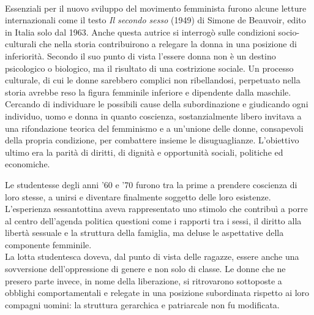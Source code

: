 \paragraph{}Essenziali per il nuovo sviluppo del movimento femminista furono alcune letture internazionali come il testo \textit{Il secondo sesso} (1949) di Simone de Beauvoir, edito in Italia solo dal 1963.
Anche questa autrice si interrogò sulle condizioni socio-culturali che nella storia contribuirono a relegare la donna in una posizione di inferiorità.
Secondo il suo punto di vista l'essere donna non è un destino psicologico o biologico, ma il risultato di una costrizione sociale.
Un processo culturale, di cui le donne sarebbero complici non ribellandosi, perpetuato nella storia avrebbe reso la figura femminile inferiore e dipendente dalla maschile.
Cercando di individuare le possibili cause della subordinazione e giudicando ogni individuo, uomo e donna in quanto coscienza, sostanzialmente libero invitava a una rifondazione teorica del femminismo e a un'unione delle donne, consapevoli della propria condizione, per combattere insieme le disuguaglianze.
L'obiettivo ultimo era la parità di diritti, di dignità e opportunità sociali, politiche ed economiche.

Le studentesse degli anni '60 e '70 furono tra la prime a prendere coscienza di loro stesse, a unirsi e diventare finalmente soggetto delle loro esistenze.
L'esperienza sessantottina aveva rappresentato uno stimolo che contribuì a porre al centro dell'agenda politica questioni come i rapporti tra i sessi, il diritto alla libertà sessuale e la struttura della famiglia, ma deluse le aspettative della componente femminile.
\\La lotta studentesca doveva, dal punto di vista delle ragazze, essere anche una sovversione dell'oppressione di genere e non solo di classe. Le donne che ne presero parte invece, in nome della liberazione, si ritrovarono sottoposte a obblighi comportamentali e relegate in una posizione subordinata rispetto ai loro compagni uomini: la struttura gerarchica e patriarcale non fu modificata.

